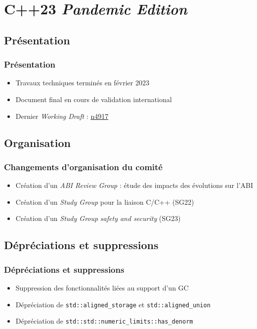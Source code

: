 \documentclass[C++.tex]{subfiles}
\begin{document}
\section{C++23 \og{}\textit{Pandemic Edition}\fg{}}
\subsection*{Présentation}
\begin{frame}
	\frametitle{Présentation}
	\begin{itemize}
		\item Travaux techniques terminés en février 2023
		\item Document final en cours de validation international
		\item Dernier \textit{Working Draft} : \href{https://github.com/cplusplus/draft/releases/download/n4917/n4917.pdf}{n4917}
	\end{itemize}
\end{frame}

\subsection*{Organisation}
\begin{frame}
	\frametitle{Changements d'organisation du comité}
	\begin{itemize}
		\item Création d'un \textit{ABI Review Group} : étude des impacts des évolutions sur l'ABI
		\item Création d'un \textit{Study Group} pour la liaison C/C++ (SG22)
		\item Création d'un \textit{Study Group} \textit{safety and security} (SG23)
	\end{itemize}
\end{frame}

\subsection*{Dépréciations et suppressions}
\begin{frame}[fragile]
	\frametitle{Dépréciations et suppressions}
	\begin{itemize}
		\item Suppression des fonctionnalités liées au support d'un GC


		\item Dépréciation de \lstinline|std::aligned_storage| et \lstinline|std::aligned_union|
		\item Dépréciation de \lstinline|std::std::numeric_limits::has_denorm|
	\end{itemize}
\end{frame}
\end{document}
